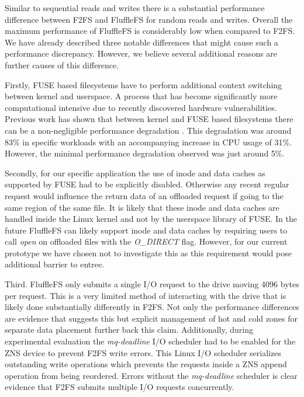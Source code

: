 
Similar to sequential reads and writes there is a substantial performance
difference between F2FS and FluffleFS for random reads and writes. Overall the
maximum performance of FluffleFS is considerably low when compared to F2FS. We
have already described three notable differences that might cause such a
performance discrepancy. However, we believe several additional reasons are
further causes of this difference.

Firstly, FUSE based filesystems have to perform additional context switching
between kernel and userspace. A process that has become significantly more
computational intensive due to recently discovered hardware vulnerabilities.
Previous work has shown that between kernel and FUSE based filesystems there can
be a non-negligible performance degradation \cite{Vangoor2017ToFO}. This
degradation was around 83\% in specific workloads with an accompanying increase
in CPU usage of 31\%. However, the minimal performance degradation observed was
just around 5\%.

Secondly, for our specific application the use of inode and data caches as
supported by FUSE had to be explicitly disabled. Otherwise any recent regular
request would influence the return data of an offloaded request if going to the
same region of the same file. It is likely that these inode and data caches are
handled inside the Linux kernel and not by the userspace library of FUSE. 
In the future FluffleFS can likely support inode and data caches by requiring
users to call \textit{open} on offloaded files with the \textit{O\_DIRECT}
flag. However, for our current prototype we have chosen not to investigate this
as this requirement would pose additional barrier to entree.

Third. FluffleFS only submits a single I/O request to the drive moving 4096
bytes per request. This is a very limited method of interacting with the drive
that is likely done substantially differently in F2FS. Not only the performance
differences are evidence that suggests this but explicit management of hot
and cold zones for separate data placement further back this claim.
Additionally, during experimental evaluation the \textit{mq-deadline} I/O
scheduler had to be enabled for the ZNS device to prevent F2FS write errors.
This Linux I/O scheduler serializes outstanding write operations which prevents
the requests inside a ZNS append operation from being reordered. Errors
without the \textit{mq-deadline} scheduler is clear evidence that F2FS submits
multiple I/O requests concurrently.

